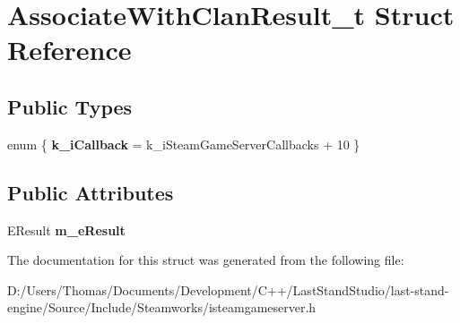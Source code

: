 \hypertarget{structAssociateWithClanResult__t}{}\section{Associate\+With\+Clan\+Result\+\_\+t Struct Reference}
\label{structAssociateWithClanResult__t}
\subsection*{Public Types}
\begin{DoxyCompactItemize}
\item 
\hypertarget{structAssociateWithClanResult__t_ac480ff899f48651a66d14544313f70b3}{}enum \{ {\bfseries k\+\_\+i\+Callback} = k\+\_\+i\+Steam\+Game\+Server\+Callbacks + 10
 \}\label{structAssociateWithClanResult__t_ac480ff899f48651a66d14544313f70b3}

\end{DoxyCompactItemize}
\subsection*{Public Attributes}
\begin{DoxyCompactItemize}
\item 
\hypertarget{structAssociateWithClanResult__t_a116dc2bc6c48e050fb88a8a9c1c545b3}{}E\+Result {\bfseries m\+\_\+e\+Result}\label{structAssociateWithClanResult__t_a116dc2bc6c48e050fb88a8a9c1c545b3}

\end{DoxyCompactItemize}


The documentation for this struct was generated from the following file\+:\begin{DoxyCompactItemize}
\item 
D\+:/\+Users/\+Thomas/\+Documents/\+Development/\+C++/\+Last\+Stand\+Studio/last-\/stand-\/engine/\+Source/\+Include/\+Steamworks/isteamgameserver.\+h\end{DoxyCompactItemize}
